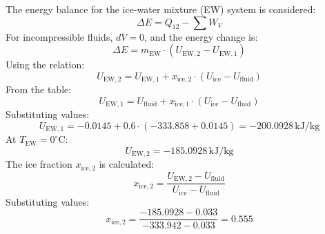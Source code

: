 The energy balance for the ice-water mixture (EW) system is considered:  
\[
\Delta E = Q_{12} - \sum W_V
\]  
For incompressible fluids, \( dV = 0 \), and the energy change is:  
\[
\Delta E = m_{\text{EW}} \cdot (U_{\text{EW},2} - U_{\text{EW},1})
\]  
Using the relation:  
\[
U_{\text{EW},2} = U_{\text{EW},1} + x_{\text{ice},2} \cdot (U_{\text{ice}} - U_{\text{fluid}})
\]  
From the table:  
\[
U_{\text{EW},1} = U_{\text{fluid}} + x_{\text{ice},1} \cdot (U_{\text{ice}} - U_{\text{fluid}})
\]  
Substituting values:  
\[
U_{\text{EW},1} = -0.0145 + 0.6 \cdot (-333.858 + 0.0145) = -200.0928 \, \text{kJ/kg}
\]  
At \( T_{\text{EW}} = 0^\circ\text{C} \):  
\[
U_{\text{EW},2} = -185.0928 \, \text{kJ/kg}
\]  
The ice fraction \( x_{\text{ice},2} \) is calculated:  
\[
x_{\text{ice},2} = \frac{U_{\text{EW},2} - U_{\text{fluid}}}{U_{\text{ice}} - U_{\text{fluid}}}
\]  
Substituting values:  
\[
x_{\text{ice},2} = \frac{-185.0928 - 0.033}{-333.942 - 0.033} = 0.555
\]
